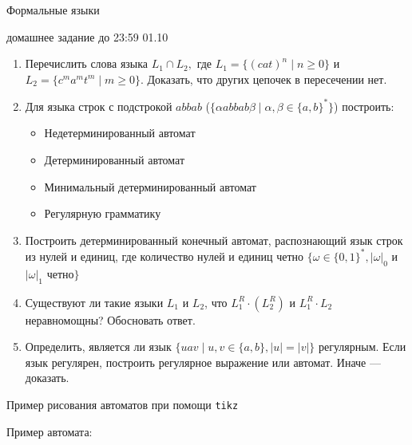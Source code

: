 \documentclass[12pt]{article}
\begin{document}
\begin{center} {\LARGE Формальные языки} \end{center}

\begin{center} \Large домашнее задание до 23:59 01.10 \end{center}
\bigskip

\begin{enumerate}
  \item
  {
    Перечислить слова языка $L_1 \cap L_2,$ где $L_1 = \{ (cat)^n \mid n \geq 0 \}$ и $L_2 = \{ c^m a^m t^m \mid m \geq 0 \}$. Доказать, что других цепочек в пересечении нет.
  }
  \item
  {
    Для языка строк с подстрокой $abbab$ ($\{\alpha a b b a b \beta \mid \alpha, \beta \in \{ a, b\}^* \}$) построить:
    \begin{itemize}
      \item Недетерминированный автомат
      \item Детерминированный автомат
      \item Минимальный детерминированный автомат
      \item Регулярную грамматику
    \end{itemize}
  }
  \item
  {
    Построить детерминированный конечный автомат, распознающий язык строк из нулей и единиц, где количество нулей и единиц четно $\{ \omega \in \{0, 1\}^*, |\omega|_0$ и $|\omega|_1$ четно$\}$
  }
  \item
  {
    Существуют ли такие языки $L_1$ и $L_2$, что $L_1^R \cdot (L_2^R)$ и $L_1^R \cdot L_2$ неравномощны? Обосновать ответ.
  }
  \item
  {
    Определить, является ли язык $\{u a v \mid u, v \in \{a, b\}, |u| = |v| \}$ регулярным. Если язык регулярен, построить регулярное выражение или автомат. Иначе --- доказать.
  }
\end{enumerate}

\newpage

\begin{center}
  \Large{Пример рисования автоматов при помощи \texttt{tikz}}
\end{center}

\bigskip

Пример автомата:
\end{document}
